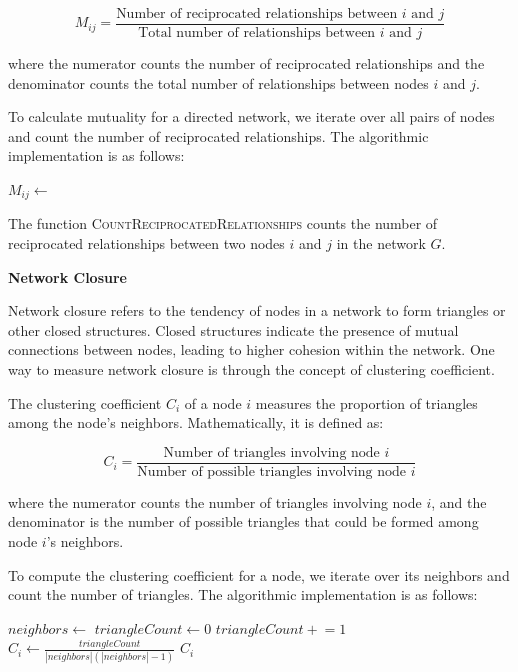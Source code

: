 \documentclass[12pt]{book} %
\begin{document}
\[
M_{ij} = \frac{\text{{Number of reciprocated relationships between }} i \text{{ and }} j}{\text{{Total number of relationships between }} i \text{{ and }} j}
\]

where the numerator counts the number of reciprocated relationships and the denominator counts the total number of relationships between nodes \(i\) and \(j\).

To calculate mutuality for a directed network, we iterate over all pairs of nodes and count the number of reciprocated relationships. The algorithmic implementation is as follows:
\FloatBarrier
\begin{algorithm}[H]
\caption{Mutuality Calculation}
\begin{algorithmic}[1]
        \State $M_{ij} \gets$ 
    \EndFor
\EndFunction
\end{algorithmic}
\end{algorithm}
\FloatBarrier

The function \textsc{CountReciprocatedRelationships} counts the number of reciprocated relationships between two nodes \(i\) and \(j\) in the network \(G\).

\textbf{Network Closure}

Network closure refers to the tendency of nodes in a network to form triangles or other closed structures. Closed structures indicate the presence of mutual connections between nodes, leading to higher cohesion within the network. One way to measure network closure is through the concept of clustering coefficient.

The clustering coefficient \(C_i\) of a node \(i\) measures the proportion of triangles among the node's neighbors. Mathematically, it is defined as:

\[
C_i = \frac{\text{{Number of triangles involving node }} i}{\text{{Number of possible triangles involving node }} i}
\]

where the numerator counts the number of triangles involving node \(i\), and the denominator is the number of possible triangles that could be formed among node \(i\)'s neighbors.

To compute the clustering coefficient for a node, we iterate over its neighbors and count the number of triangles. The algorithmic implementation is as follows:
\FloatBarrier
\begin{algorithm}[H]
\caption{Clustering Coefficient Calculation}
\begin{algorithmic}[1]
    \State $neighbors \gets$ 
    \State $triangleCount \gets 0$
                \State $triangleCount \mathrel{+}= 1$
            \EndIf
        \EndFor
    \EndFor
    \State $C_i \gets \frac{triangleCount}{|neighbors|(|neighbors|-1)}$
    \State \Return $C_i$
\EndFunction
\end{algorithmic}
\end{algorithm}
\FloatBarrier
\end{document}
